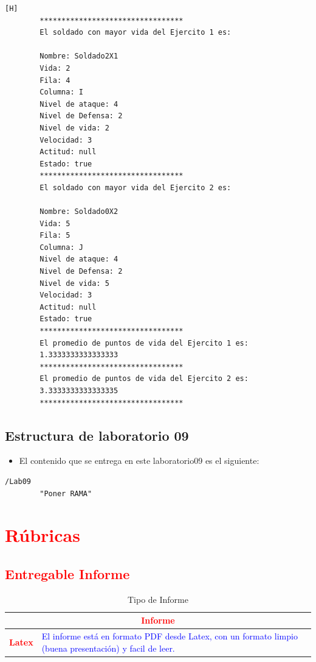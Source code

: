 \documentclass{article}
\begin{document}
	\begin{lstlisting}[language=bash,caption={Ejecucion:}][H]
		*********************************
		El soldado con mayor vida del Ejercito 1 es: 
		
		Nombre: Soldado2X1
		Vida: 2
		Fila: 4
		Columna: I
		Nivel de ataque: 4
		Nivel de Defensa: 2
		Nivel de vida: 2
		Velocidad: 3
		Actitud: null
		Estado: true
		*********************************
		El soldado con mayor vida del Ejercito 2 es: 
		
		Nombre: Soldado0X2
		Vida: 5
		Fila: 5
		Columna: J
		Nivel de ataque: 4
		Nivel de Defensa: 2
		Nivel de vida: 5
		Velocidad: 3
		Actitud: null
		Estado: true
		*********************************
		El promedio de puntos de vida del Ejercito 1 es: 
		1.3333333333333333
		*********************************
		El promedio de puntos de vida del Ejercito 2 es: 
		3.3333333333333335
		*********************************

	\end{lstlisting}
	\subsection{Estructura de laboratorio 09}
	\begin{itemize}	
		\item El contenido que se entrega en este laboratorio09 es el siguiente:
	\end{itemize}
	\begin{lstlisting}[style=ascii-tree]
	/Lab09	
		"Poner RAMA"

	\end{lstlisting}    
	\section{\textcolor{red}{Rúbricas}}
	
	\subsection{\textcolor{red}{Entregable Informe}}
	\begin{table}[H]
		\caption{Tipo de Informe}
		\setlength{\tabcolsep}{0.5em} %
		{\renewcommand{\arraystretch}{1.5}%
		\begin{tabular}{|p{3cm}|p{12cm}|}
			\hline
			\multicolumn{2}{|c|}{\textbf{\textcolor{red}{Informe}}}  \\
			\hline 
			\textbf{\textcolor{red}{Latex}} & \textcolor{blue}{El informe está en formato PDF desde Latex,  con un formato limpio (buena presentación) y facil de leer.}   \\ 
			\hline 
			
			
		\end{tabular}
	}
	\end{table}
	
\end{document}
